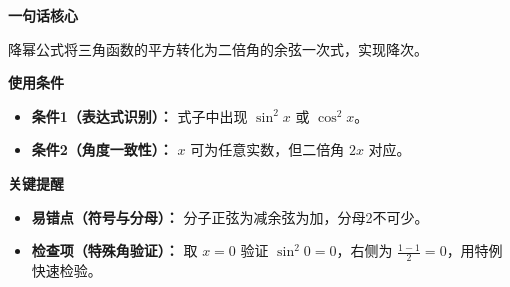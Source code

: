 \begin{summarybox}

	\textbf{\textcolor{CSummary}{一句话核心}}

	降幂公式将三角函数的平方转化为二倍角的余弦一次式，实现降次。

	\medskip
	\textbf{\textcolor{CSummary}{使用条件}}
	\begin{itemize}[leftmargin=*, itemsep=0.5em, topsep=0.4em]
		\item \textbf{条件1（表达式识别）：} 式子中出现 $\sin^2 x$ 或 $\cos^2 x$。
		\item \textbf{条件2（角度一致性）：} $x$ 可为任意实数，但二倍角 $2x$ 对应。
	\end{itemize}

	\medskip
	\textbf{\textcolor{CSummary}{关键提醒}}
	\begin{itemize}[leftmargin=*, itemsep=0.5em, topsep=0.4em]
		\item \textbf{易错点（符号与分母）：} 分子正弦为减余弦为加，分母2不可少。
		\item \textbf{检查项（特殊角验证）：} 取 $x=0$ 验证 $\sin^2 0=0$，右侧为 $\frac{1-1}{2}=0$，用特例快速检验。
	\end{itemize}
\end{summarybox}
